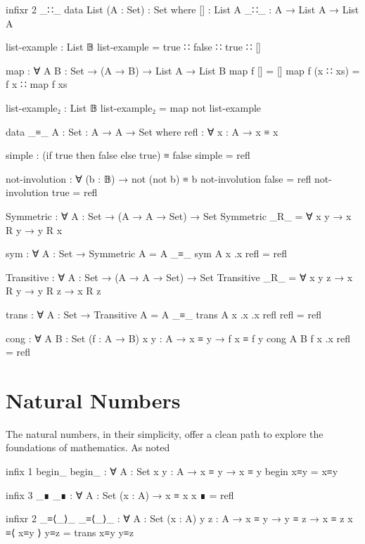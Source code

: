 \documentclass[./Thesis.tex]{subfiles}
\begin{document}
\begin{code}
  infixr 2 _∷_
  data List (A : Set) : Set where
    []  : List A
    _∷_ : A → List A → List A

  list-example : List 𝔹
  list-example = true ∷ false ∷ true ∷ []

  map : ∀ {A B : Set} → (A → B) → List A → List B
  map f [] = []
  map f (x ∷ xs) = f x ∷ map f xs

  list-example₂ : List 𝔹
  list-example₂ = map not list-example
\end{code}

\begin{code}
  data _≡_ {A : Set} : A → A → Set where
    refl : ∀ {x : A} → x ≡ x

  simple : (if true then false else true) ≡ false
  simple = refl

  not-involution : ∀ (b : 𝔹) → not (not b) ≡ b
  not-involution false = refl
  not-involution true = refl
\end{code}

\begin{code}
  Symmetric : ∀ {A : Set} → (A → A → Set) → Set
  Symmetric _R_ = ∀ {x y} → x R y → y R x

  sym : ∀ {A : Set} → Symmetric {A = A} _≡_
  sym {A} {x} {.x} refl = refl

  Transitive : ∀ {A : Set} → (A → A → Set) → Set
  Transitive _R_ = ∀ {x y z} → x R y → y R z → x R z

  trans : ∀ {A : Set} → Transitive {A = A} _≡_
  trans {A} {x} {.x} {.x} refl refl = refl

  cong : ∀ {A B : Set} (f : A → B) {x y : A} → x ≡ y → f x ≡ f y
  cong {A} {B} f {x} {.x} refl = refl
\end{code}

\section{Natural Numbers}
\label{sec:natural-numbers}

The natural numbers, in their simplicity, offer a clean path to explore the
foundations of mathematics. As noted 

\begin{code}
  infix  1 begin_
  begin_ : ∀ {A : Set} {x y : A} → x ≡ y → x ≡ y
  begin x≡y = x≡y

  infix  3 _∎
  _∎ : ∀ {A : Set} (x : A) → x ≡ x
  x ∎ = refl

  infixr 2 _≡⟨_⟩_
  _≡⟨_⟩_ : ∀ {A : Set} (x : A) {y z : A} → x ≡ y → y ≡ z → x ≡ z
  x ≡⟨ x≡y ⟩ y≡z = trans x≡y y≡z
\end{code}
\end{document}
